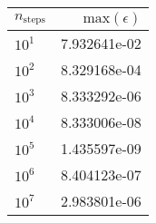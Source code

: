 \begin{tabular}{l|r}
\toprule
 $n_{\mathrm{steps}}$ &  $\mathrm{max}(\epsilon)$ \\
\midrule
                $10^1$ &              7.932641e-02 \\
                $10^2$ &              8.329168e-04 \\
                $10^3$ &              8.333292e-06 \\
                $10^4$ &              8.333006e-08 \\
                $10^5$ &              1.435597e-09 \\
                $10^6$ &              8.404123e-07 \\
                $10^7$ &              2.983801e-06 \\
\bottomrule
\end{tabular}
